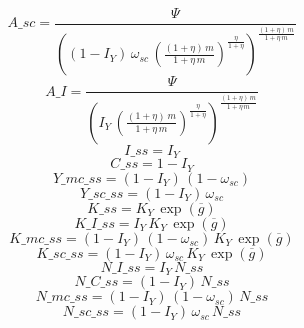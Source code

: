 \begin{dmath*}
A\_sc = \frac{{{\Psi}}}{\left(\left(1-{{I_Y}}\right)\, {\omega_{sc}}\, \left(\frac{\left(1+{{\eta}}\right)\, {{m}}}{1+{{\eta}}\, {{m}}}\right)^{\frac{{{\eta}}}{1+{{\eta}}}}\right)^{\frac{\left(1+{{\eta}}\right)\, {{m}}}{1+{{\eta}}\, {{m}}}}}
\end{dmath*}
\begin{dmath*}
A\_I = \frac{{{\Psi}}}{\left({{I_Y}}\, \left(\frac{\left(1+{{\eta}}\right)\, {{m}}}{1+{{\eta}}\, {{m}}}\right)^{\frac{{{\eta}}}{1+{{\eta}}}}\right)^{\frac{\left(1+{{\eta}}\right)\, {{m}}}{1+{{\eta}}\, {{m}}}}}
\end{dmath*}
\begin{dmath*}
I\_ss = {{I_Y}}
\end{dmath*}
\begin{dmath*}
C\_ss = 1-{{I_Y}}
\end{dmath*}
\begin{dmath*}
Y\_mc\_ss = \left(1-{{I_Y}}\right)\, \left(1-{\omega_{sc}}\right)
\end{dmath*}
\begin{dmath*}
Y\_sc\_ss = \left(1-{{I_Y}}\right)\, {\omega_{sc}}
\end{dmath*}
\begin{dmath*}
K\_ss = {{K_Y}}\, \exp\left({{\overline{g}}}\right)
\end{dmath*}
\begin{dmath*}
K\_I\_ss = {{I_Y}}\, {{K_Y}}\, \exp\left({{\overline{g}}}\right)
\end{dmath*}
\begin{dmath*}
K\_mc\_ss = \left(1-{{I_Y}}\right)\, \left(1-{\omega_{sc}}\right)\, {{K_Y}}\, \exp\left({{\overline{g}}}\right)
\end{dmath*}
\begin{dmath*}
K\_sc\_ss = \left(1-{{I_Y}}\right)\, {\omega_{sc}}\, {{K_Y}}\, \exp\left({{\overline{g}}}\right)
\end{dmath*}
\begin{dmath*}
N\_I\_ss = {{I_Y}}\, {N\_ss}
\end{dmath*}
\begin{dmath*}
N\_C\_ss = \left(1-{{I_Y}}\right)\, {N\_ss}
\end{dmath*}
\begin{dmath*}
N\_mc\_ss = \left(1-{{I_Y}}\right)\, \left(1-{\omega_{sc}}\right)\, {N\_ss}
\end{dmath*}
\begin{dmath*}
N\_sc\_ss = \left(1-{{I_Y}}\right)\, {\omega_{sc}}\, {N\_ss}
\end{dmath*}
